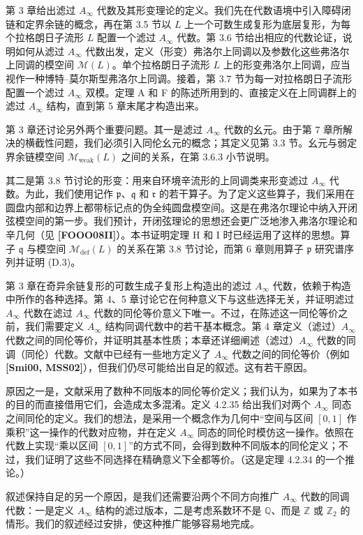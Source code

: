 第 3 章给出滤过 $A_\infty$ 代数及其形变理论的定义。我们先在代数语境中引入障碍闭链和定界余链的概念，再在第 3.5 节以 $L$ 上一个可数生成复形为底层复形，为每个拉格朗日子流形 $L$ 配置一个滤过 $A_\infty$ 代数。第 3.6 节给出相应的代数论证，说明如何从滤过 $A_\infty$ 代数出发，定义（形变）弗洛尔上同调以及参数化这些弗洛尔上同调的模空间 $\mathcal M(L)$。单个拉格朗日子流形 $L$ 上的形变弗洛尔上同调，应当视作一种博特--莫尔斯型弗洛尔上同调。接着，第 3.7 节为每一对拉格朗日子流形配置一个滤过 $A_\infty$ 双模。定理 A 和 F 的陈述所用到的、直接定义在上同调群上的滤过 $A_\infty$ 结构，直到第 5 章末尾才构造出来。

第 3 章还讨论另外两个重要问题。其一是滤过 $A_\infty$ 代数的幺元。由于第 7 章所解决的横截性问题，我们必须引入同伦幺元的概念；其定义见第 3.3 节。幺元与弱定界余链模空间 $\mathcal M_{\mathrm{weak}}(L)$ 之间的关系，在第 3.6.3 小节说明。

其二是第 3.8 节讨论的形变：用来自环境辛流形的上同调类来形变滤过 $A_\infty$ 代数。为此，我们使用记作 $\mathfrak p$、$\mathfrak q$ 和 $\mathfrak r$ 的若干算子。为了定义这些算子，我们采用在圆盘内部和边界上都带标记点的伪全纯圆盘模空间。这是在弗洛尔理论中纳入开闭弦模空间的第一步。我们预计，开闭弦理论的思想还会更广泛地渗入弗洛尔理论和辛几何（见 \textbf{[FOOO08II]}）。本书证明定理 H 和 I 时已经运用了这样的思想。算子 $\mathfrak q$ 与模空间 $\mathcal M_{\mathrm{def}}(L)$ 的关系在第 3.8 节讨论，而第 6 章则用算子 $\mathfrak p$ 研究谱序列并证明 (D.3)。

第 3 章在奇异余链复形的可数生成子复形上构造出的滤过 $A_\infty$ 代数，依赖于构造中所作的各种选择。第 4、5 章讨论它在何种意义下与这些选择无关，并证明滤过 $A_\infty$ 代数在滤过 $A_\infty$ 代数的同伦等价意义下唯一。不过，在陈述这一同伦等价之前，我们需要定义 $A_\infty$ 结构同调代数中的若干基本概念。第 4 章定义（滤过）$A_\infty$ 代数之间的同伦等价，并证明其基本性质；本章还详细阐述（滤过）$A_\infty$ 代数的同调（同伦）代数。文献中已经有一些地方定义了 $A_\infty$ 代数之间的同伦等价（例如 \textbf{[Smi00, MSS02]}），但我们仍尽可能给出自足的叙述。这有若干原因。

原因之一是，文献采用了数种不同版本的同伦等价定义；我们认为，如果为了本书的目的而直接借用它们，会造成太多混淆。定义 4.2.35 给出我们对两个 $A_\infty$ 同态之间同伦的定义。我们的想法，是采用一个概念作为几何中“空间与区间 $[0,1]$ 作乘积”这一操作的代数对应物，并在定义 $A_\infty$ 同态的同伦时模仿这一操作。依照在代数上实现“乘以区间 $[0,1]$”的方式不同，会得到数种不同版本的同伦定义；不过，我们证明了这些不同选择在精确意义下全都等价。（这是定理 4.2.34 的一个推论。）

叙述保持自足的另一个原因，是我们还需要沿两个不同方向推广 $A_\infty$ 代数的同调代数：一是定义 $A_\infty$ 结构的滤过版本，二是考虑系数环不是 $\mathbb Q$、而是 $\mathbb Z$ 或 $\mathbb Z_2$ 的情形。我们的叙述经过安排，使这种推广能够容易地完成。

